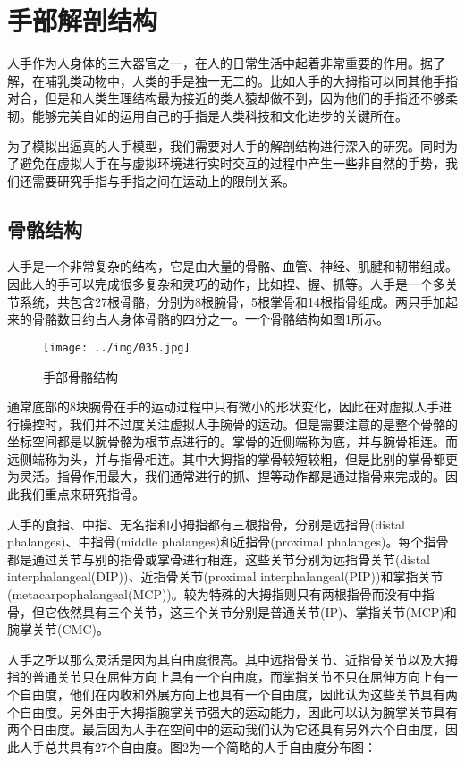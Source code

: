 \chapter{手部解剖结构}
\label{chap:intro}
人手作为人身体的三大器官之一，在人的日常生活中起着非常重要的作用。据了解，在哺乳类动物中，人类的手是独一无二的。比如人手的大拇指可以同其他手指对合，但是和人类生理结构最为接近的类人猿却做不到，因为他们的手指还不够柔韧\cite{handBaike}。能够完美自如的运用自己的手指是人类科技和文化进步的关键所在。

为了模拟出逼真的人手模型，我们需要对人手的解剖结构进行深入的研究。同时为了避免在虚拟人手在与虚拟环境进行实时交互的过程中产生一些非自然的手势，我们还需要研究手指与手指之间在运动上的限制关系。

\section{骨骼结构}

人手是一个非常复杂的结构，它是由大量的骨骼、血管、神经、肌腱和韧带组成。因此人的手可以完成很多复杂和灵巧的动作，比如捏、握、抓等。人手是一个多关节系统，共包含27根骨骼\cite{Tubiana90}，分别为8根腕骨，5根掌骨和14根指骨组成。两只手加起来的骨骼数目约占人身体骨骼的四分之一。一个骨骼结构如图1所示。


\begin{figure}[htb]
\centering
\texttt{[image: ../img/035.jpg]}
\caption{手部骨骼结构}
\label{fig：graph}
\end{figure}

通常底部的8块腕骨在手的运动过程中只有微小的形状变化\cite{gong2005}，因此在对虚拟人手进行操控时，我们并不过度关注虚拟人手腕骨的运动。但是需要注意的是整个骨骼的坐标空间都是以腕骨骼为根节点进行的。掌骨的近侧端称为底，并与腕骨相连。而远侧端称为头，并与指骨相连。其中大拇指的掌骨较短较粗，但是比别的掌骨都更为灵活。指骨作用最大，我们通常进行的抓、捏等动作都是通过指骨来完成的。因此我们重点来研究指骨。

人手的食指、中指、无名指和小拇指都有三根指骨，分别是远指骨(distal
phalanges)、中指骨(middle phalanges)和近指骨(proximal
phalanges)\cite{Kapit93}。每个指骨都是通过关节与别的指骨或掌骨进行相连，这些关节分别为远指骨关节(distal
interphalangeal(DIP))、近指骨关节(proximal
interphalangeal(PIP))和掌指关节(metacarpophalangeal(MCP))。较为特殊的大拇指则只有两根指骨而没有中指骨，但它依然具有三个关节，这三个关节分别是普通关节(IP)、掌指关节(MCP)和腕掌关节(CMC)。

人手之所以那么灵活是因为其自由度很高。其中远指骨关节、近指骨关节以及大拇指的普通关节只在屈伸方向上具有一个自由度，而掌指关节不只在屈伸方向上有一个自由度，他们在内收和外展方向上也具有一个自由度，因此认为这些关节具有两个自由度。另外由于大拇指腕掌关节强大的运动能力，因此可以认为腕掌关节具有两个自由度。最后因为人手在空间中的运动我们认为它还具有另外六个自由度，因此人手总共具有27个自由度。图2为一个简略的人手自由度分布图：


